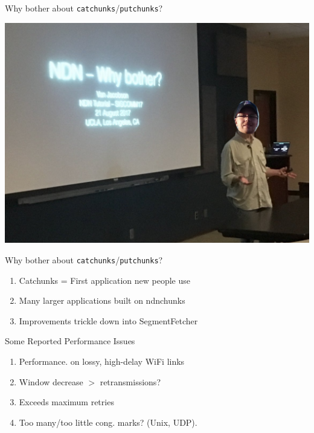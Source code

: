 
\begin{frame}{Why bother about \texttt{catchunks}/\texttt{putchunks}?}

\includegraphics[width=\linewidth]{images/why_bother2.png}

\end{frame}


\begin{frame}{Why bother about \texttt{catchunks}/\texttt{putchunks}?}


\begin{enumerate}
\item Catchunks = First application new people use
\pause
\item Many larger applications built on ndnchunks
\pause
\item Improvements trickle down into SegmentFetcher
\end{enumerate}

\end{frame}


\begin{frame}{Some Reported Performance Issues}

\begin{enumerate}
\item Performance. on lossy, high-delay WiFi links


\pause
\item Window decrease $>$ retransmissions? 

\pause
\item Exceeds maximum retries

\pause
\item Too many/too little cong. marks? (Unix, UDP).
\end{enumerate}

\end{frame}



